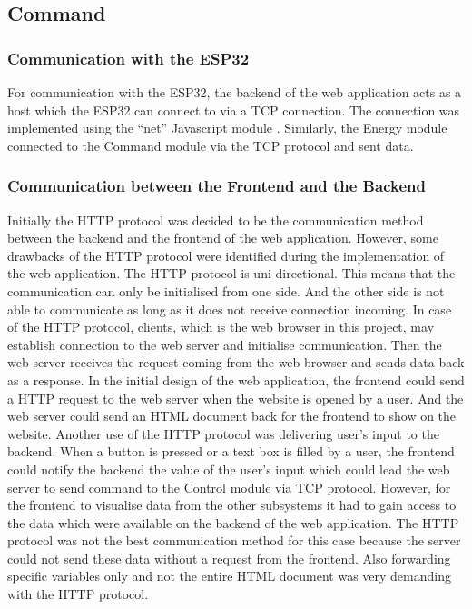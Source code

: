 \documentclass[a4paper]{article}
\begin{document}
\subsection{Command}

\subsubsection{Communication with the ESP32}
For communication with the ESP32, the backend of the web application acts as a 
host which the ESP32 can connect to via a TCP connection. The connection was implemented 
using the “net” Javascript module \cite{JavascriptTCP}. Similarly, the Energy module 
connected to the Command module via the TCP protocol and sent data. 

\subsubsection{Communication between the Frontend and the Backend}

Initially the HTTP protocol was decided to be the communication method between the 
backend and the frontend of the web application. However, some drawbacks of the HTTP 
protocol were identified during the implementation of the web application. The HTTP 
protocol is uni-directional. \cite{HTTPOverview} This means that the communication can only 
be initialised from one side. And the other side is not able to communicate as long 
as it does not receive connection incoming. In case of the HTTP protocol, clients, 
which is the web browser in this project, may establish connection to the web server 
and initialise communication. Then the web server receives the request coming from the 
web browser and sends data back as a response. In the initial design of the web application, 
the frontend could send a HTTP request to the web server when the website is opened by a user. 
And the web server could send an HTML document back for the frontend to show on the website. 
Another use of the HTTP protocol was delivering user’s input to the backend. When a button 
is pressed or a text box is filled by a user, the frontend could notify the backend the 
value of the user’s input which could lead the web server to send command to the Control 
module via TCP protocol. However, for the frontend to visualise data from the other subsystems 
it had to gain access to the data which were available on the backend of the web application. 
The HTTP protocol was not the best communication method for this case because the server could 
not send these data without a request from the frontend. Also forwarding specific variables only 
and not the entire HTML document was very demanding with the HTTP protocol. 
\end{document}
